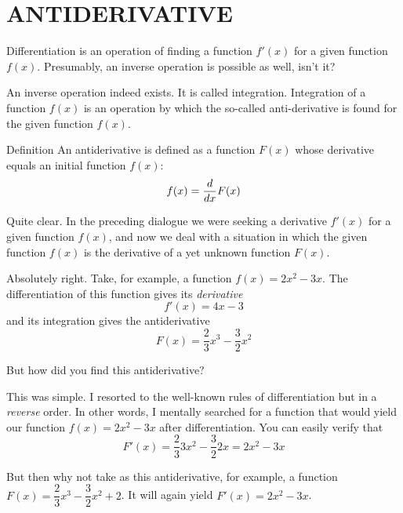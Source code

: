 

\chapter{ANTIDERIVATIVE}
\label{antiderivative}

\rdr Differentiation is an operation of finding a function $f' (x)$ for a given function $f (x)$. Presumably, an inverse operation is possible as well, isn't it?

\athr An inverse operation indeed exists. It is called integration. Integration of a function $f (x)$ is an operation by which the so-called anti-derivative is found for the given function $f(x)$.

\begin{mytheo}{Definition}
An antiderivative is defined as a function $F (x)$ whose derivative equals an initial function $f (x)$:
\begin{equation}%
f(x)= \ddx F(x)	
\label{antideriv-def}
\end{equation}
\end{mytheo}

\rdr Quite clear. In the preceding dialogue we were seeking a derivative $f' (x)$ for a given function $f (x)$, and now we deal with a situation in which the given function $f (x)$ is the derivative of a yet unknown function $F (x)$.

\athr Absolutely right. Take, for example, a function $f (x) = 2x^{2} -	3x$. The differentiation of this function gives its \emph{derivative}
\begin{equation*}%
f'(x) = 4x -3
\end{equation*}
 and its integration gives the antiderivative
\begin{equation*}%
F(x) = \frac{2}{3} x^{3} - \frac{3}{2} x^{2}
\end{equation*}

\rdr But how did you find this antiderivative?

\athr This was simple. I resorted to the well-known rules of differentiation but in a \emph{reverse} order. In other words, I mentally searched for a function that would yield our function $f (x) = 2x^{2} -	3x$ after differentiation. You can easily verify that
\begin{equation*}%
F'(x) = \frac{2}{3} 3 x^{2} - \frac{3}{2} 2 x = 2 x^{2} - 3 x
\end{equation*}

\rdr But then why not take as this antiderivative, for example, a function $F(x)= \dfrac{2}{3} x^{3} - \dfrac{3}{2} x^{2} + 2$.  It will again yield $F' (x) = 2 x^{2} - 3 x$. 

